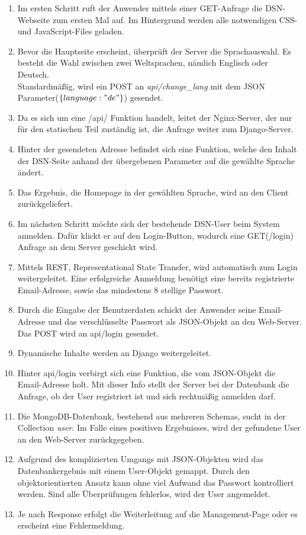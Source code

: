 \begin{enumerate}
\item Im ersten Schritt ruft der Anwender mittels einer GET-Anfrage die DSN-Webseite zum ersten Mal auf. Im Hintergrund werden alle notwendigen CSS- und JavaScript-Files geladen.
\item Bevor die Hauptseite erscheint, überprüft der Server die Sprachauswahl. Es besteht die Wahl zwischen zwei Weltsprachen, nämlich Englisch oder Deutsch.\\
Standardmäßig, wird ein POST an \textit{api/change\_lang} mit dem JSON Parameter($\{language:"de"\}$) gesendet.
\item Da es sich um eine /api/ Funktion handelt, leitet der Nginx-Server, der nur für den statischen Teil zuständig ist, die Anfrage weiter zum Django-Server.
\item Hinter der gesendeten Adresse befindet sich eine Funktion, welche den Inhalt der DSN-Seite anhand der übergebenen Parameter auf die gewählte Sprache ändert.
\item Das Ergebnis, die Homepage in der gewählten Sprache, wird an den Client zurückgeliefert.
\item Im nächsten Schritt möchte sich der bestehende DSN-User beim System anmelden. Dafür klickt er auf den Login-Button, wodurch eine GET(/login) Anfrage an dem Server geschickt wird.
\item Mittels REST, Representational State Transfer, wird automatisch zum Login weitergeleitet. Eine erfolgreiche Anmeldung benötigt eine bereits registrierte Email-Adresse, sowie das mindestens 8 stellige Passwort.
\item Durch die Eingabe der Benutzerdaten schickt der Anwender seine Email-Adresse und das verschlüsselte Passwort als JSON-Objekt an den Web-Server. Das POST wird an api/login gesendet.
\item Dynamische Inhalte werden an Django weitergeleitet.
\item Hinter api/login verbirgt sich eine Funktion, die vom JSON-Objekt die Email-Adresse holt. Mit dieser Info stellt der Server bei der Datenbank die Anfrage, ob der User registriert ist und sich rechtmäßig anmelden darf.
\item Die MongoDB-Datenbank, bestehend aus mehreren Schemas, sucht in der Collection \textit{user}. Im Falle eines positiven Ergebnisses, wird der gefundene User an den Web-Server zurückgegeben.
\item Aufgrund des komplizierten Umgangs mit JSON-Objekten wird das Datenbankergebnis mit einem User-Objekt gemappt. Durch den objektorientierten Ansatz kann ohne viel Aufwand das Passwort kontrolliert werden. Sind alle Überprüfungen fehlerlos, wird der User angemeldet.
\item Je nach Response erfolgt die Weiterleitung auf die Management-Page oder es erscheint eine Fehlermeldung.
\end{enumerate}

